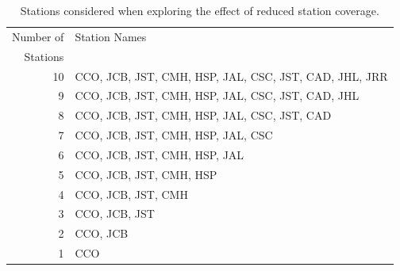 \documentclass[draft,jgrga]{agutex}
\begin{document}
\clearpage
\begin{table}
\caption{Stations considered when exploring the effect of reduced station coverage.}
\label{tab:Calaveras-stationremoval}
\begin{tabular}{|r|l|}
\hline
Number of & Station Names\\
Stations  & \\
\hline
10 & CCO, JCB, JST, CMH, HSP, JAL, CSC, JST, CAD, JHL, JRR\\
9  & CCO, JCB, JST, CMH, HSP, JAL, CSC, JST, CAD, JHL\\
8  & CCO, JCB, JST, CMH, HSP, JAL, CSC, JST, CAD\\
7  & CCO, JCB, JST, CMH, HSP, JAL, CSC \\
6  & CCO, JCB, JST, CMH, HSP, JAL \\
5  & CCO, JCB, JST, CMH, HSP \\
4  & CCO, JCB, JST, CMH \\
3  & CCO, JCB, JST \\
2  & CCO, JCB \\
1  & CCO \\
\hline
\end{tabular}
\end{table}
\end{document}
